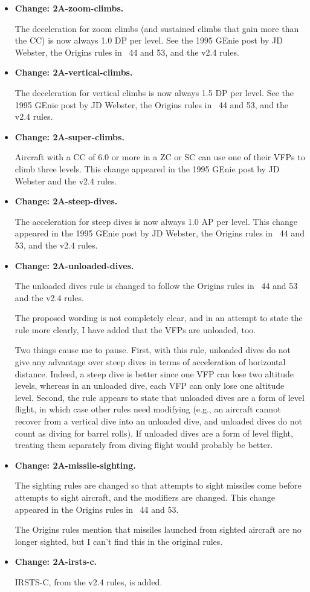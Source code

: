 \documentclass[10pt]{report}
\newcommand{\itemtag}[1]{\item \textbf{Change: #1.}\par}
\begin{document}
\begin{itemize}
    \itemtag{2A-zoom-climbs} The deceleration for zoom climbs (and sustained climbs that gain more than the CC) is now always 1.0 DP per level. See the 1995 GEnie post by JD Webster, the Origins rules {in \APJ}~44 and 53, and the v2.4 rules.

    \itemtag{2A-vertical-climbs} The deceleration for vertical climbs is now always 1.5 DP per level. See the 1995 GEnie post by JD Webster, the Origins rules {in \APJ}~44 and 53, and the v2.4 rules.

    \itemtag{2A-super-climbs} Aircraft with a CC of 6.0 or more in a ZC or SC can use one of their VFPs to climb three levels. This change appeared in the 1995 GEnie post by JD Webster and the v2.4 rules.

    \itemtag{2A-steep-dives} The acceleration for steep dives is now always 1.0 AP per level. This change appeared in the 1995 GEnie post by JD Webster, the Origins rules in {\APJ}~44 and 53, and the v2.4 rules.

    \itemtag{2A-unloaded-dives} The unloaded dives rule is changed to follow the Origins rules in {\APJ}~44 and 53 and the v2.4 rules.
    
    The proposed wording is not completely clear, and in an attempt to state the rule more clearly, I have added that the VFPs are unloaded, too. 
    
    Two things cause me to pause. First, with this rule, unloaded dives do not give any advantage over steep dives in terms of acceleration of horizontal distance. Indeed, a steep dive is better since one VFP can lose two altitude levels, whereas in an unloaded dive, each VFP can only lose one altitude level. Second, the rule appears to state that unloaded dives are a form of level flight, in which case other rules need modifying (e.g., an aircraft cannot recover from a vertical dive into an unloaded dive, and unloaded dives do not count as diving for barrel rolls). If unloaded dives are a form of level flight, treating them separately from diving flight would probably be better.

    \itemtag{2A-missile-sighting} The sighting rules are changed so that attempts to sight missiles come before attempts to sight aircraft, and the modifiers are changed. This change appeared in the Origins rules in {\APJ}~44 and 53.
    
    The Origins rules mention that missiles launched from sighted aircraft are no longer sighted, but I can’t find this in the original rules.
    
    \itemtag{2A-irsts-c} IRSTS-C, from the v2.4 rules, is added.


\end{itemize}
\end{document}
